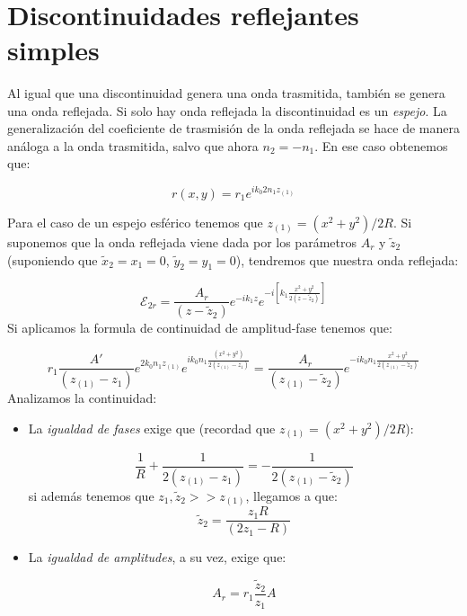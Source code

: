 \documentclass[12pt,a4paper]{book}
\numberwithin{equation}{section}
\numberwithin{figure}{section}
\newcommand{\ccorchetes}[1]{\left[ #1  \right]}
\newcommand{\1}{_{(1)}}
\newcommand{\2}{_{(2)}}
\theoremstyle{definition}
\begin{document}
\hrulefill \\

\section{Discontinuidades reflejantes simples}

Al igual que una discontinuidad genera una onda trasmitida, también se genera una onda reflejada. Si solo hay onda reflejada la discontinuidad es un \textit{espejo}. La generalización del coeficiente de trasmisión de la onda reflejada se hace de manera análoga a la onda trasmitida, salvo que ahora $n_2 = - n_1$. En ese caso obtenemos que:

\begin{equation}
r(x,y) = r_1 e^{i k_0 2 n_1 z_{(1)}}
\end{equation}


\hrulefill

Para el caso de un espejo esférico tenemos que $z_{(1)} = (x^2+y^2)/2R$. Si suponemos que la onda reflejada viene dada por los parámetros $A_{r}$ y $\tilde{z}_2$ (suponiendo que $\tilde{x}_2 = x_1 = 0$, $\tilde{y}_2 = y_1 = 0$), tendremos que nuestra onda reflejada:

\begin{equation}
\mathcal{E}_{2r} = \frac{A_{r}}{(z-\tilde{z}_2)} e^{- i k_1 z} e^{- i \ccorchetes{k_1 \frac{x^2 + y^2}{2(z-\tilde{z}_2)}}}
\end{equation}
Si aplicamos la formula de continuidad de amplitud-fase tenemos que:

\begin{equation}
r_1 \frac{A'}{(z_{(1)}-z_1)} e^{2k_0n_1 z_{(1)}} e^{i k_0 n_1 \frac{(x^2+y^2)}{2(z_{(1)}-z_1)}} = \frac{A_r}{(z_{(1)}-\tilde{z}_2)} e^{-i k_0 n_1 \frac{x^2+y^2}{2(z_{(1)}-\tilde{z}_2)}}
\end{equation}
Analizamos la continuidad:

\begin{itemize}
\item La \textit{igualdad de fases} exige que (recordad que $z_{(1)} = (x^2+y^2)/2R$):

\begin{equation}
\dfrac{1}{R} + \frac{1}{2(z_{(1)}-z_1)} = -\frac{1}{2(z_{(1)}-\tilde{z}_2)}
\end{equation}
si además tenemos que $z_1,\tilde{z}_2 >> z_{(1)}$, llegamos a que:
\begin{equation}
\tilde{z}_2 = \frac{z_1 R}{(2z_1 - R)}
\end{equation}

\item La \textit{igualdad de amplitudes}, a su vez, exige que:

\begin{equation}
A_r = r_1 \frac{\tilde{z}_2}{z_1} A
\end{equation}


\end{itemize}
\end{document}
